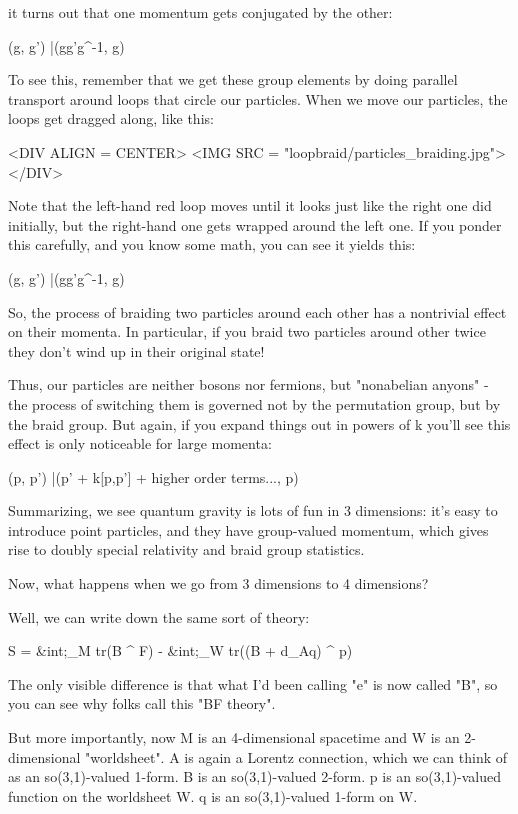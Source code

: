 it turns out that one momentum gets conjugated by the other:

(g, g') |\to  (gg'g^{-1}, g)

To see this, remember that we get these group elements by doing
parallel transport around loops that circle our particles.  When
we move our particles, the loops get dragged along, like this:

<DIV ALIGN = CENTER>
<IMG SRC = "loopbraid/particles_braiding.jpg">
</DIV>

Note that the left-hand red loop moves until it looks just
like the right one did initially, but the right-hand one gets
wrapped around the left one.  If you ponder this carefully, 
and you know some math, you can see it yields this:

(g, g') |\to  (gg'g^{-1}, g)

So, the process of braiding two particles around each other has a
nontrivial effect on their momenta.  In particular, if you braid two
particles around other twice they don't wind up in their original
state!  

Thus, our particles are neither bosons nor fermions, but
"nonabelian anyons" - the process of switching them is
governed not by the permutation group, but by the braid group.  
But again, if you expand things out in powers of k you'll see this 
effect is only noticeable for large momenta:

(p, p') |\to  (p' + k[p,p'] + higher order terms..., p)

Summarizing, we see quantum gravity is lots of fun in 3 dimensions:
it's easy to introduce point particles, and they have group-valued
momentum, which gives rise to doubly special relativity and braid
group statistics.

Now, what happens when we go from 3 dimensions to 4 dimensions?

Well, we can write down the same sort of theory:

S   =   
&int;_{M}  tr(B ^ F)   -  
&int;_{W}  tr((B + d_{A}q) ^ p)

The only visible difference is that what I'd been calling
"e" is now called "B", so you can see why folks
call this "BF theory". 

But more importantly, now M is an 4-dimensional spacetime and W is an 
2-dimensional "worldsheet".  A is again a Lorentz connection, which 
we can think of as an so(3,1)-valued 1-form.   B is an so(3,1)-valued 
2-form.  p is an so(3,1)-valued function on the worldsheet W.  q is an 
so(3,1)-valued 1-form on W.

